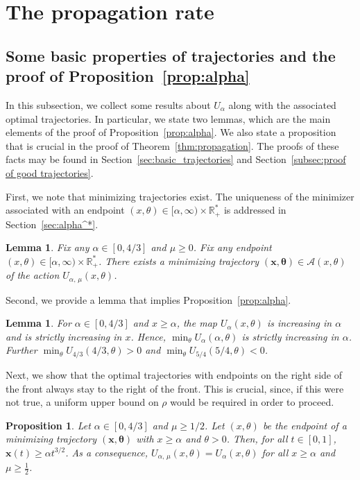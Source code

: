 \documentclass[10pt]{amsart}
\newtheorem{lemm}[theo]{Lemma}\newtheorem{prop}[theo]{Proposition}\newtheorem{coro}[theo]{Corollary}\newtheorem{conj}[theo]{Conjecture}
\theoremstyle{definition}\newtheorem{defi}[theo]{Definition}\newtheorem{rema}[theo]{Remark}\newtheorem{exam}[theo]{Example}\newtheorem{exem}[theo]{Example}\newtheorem{nota}[theo]{Notation}
\newcommand{\R}{\mathbb{R}}
\newcommand{\bx}{\mathbf{x}}
\newcommand{\mA}{\mathcal{A}}
\newcommand{\btheta}{\boldsymbol{\theta}}
\newcommand{\1}{\mathds{1}}
\begin{document}
\section{The propagation rate}
\label{sec:contradiction}

\subsection{Some basic properties of trajectories and the proof of Proposition~\ref{prop:alpha}}\label{sec:prop:alpha}
In this subsection, we collect some results about $U_\alpha$ along with the associated optimal trajectories. In particular, we state two lemmas, which are the main elements of the proof of Proposition~\ref{prop:alpha}. We also state a proposition that is crucial in the proof of Theorem~\ref{thm:propagation}. The proofs of these facts may be found in Section~\ref{sec:basic_trajectories} and Section~\ref{subsec:proof of good trajectories}.

First, we note that minimizing trajectories exist. The uniqueness of the minimizer associated with an endpoint $(x,\theta)\in [\alpha,\infty)\times\R_+^*$ is addressed in Section~\ref{sec:alpha^*}.

\begin{lemm}\label{lem:minimizer_existence}
Fix any $\alpha \in [0,4/3]$ and $\mu \geq 0$. Fix any endpoint $(x,\theta) \in [\alpha,\infty)\times\R_+^*$. There exists a minimizing trajectory $(\bx,\btheta) \in \mA(x,\theta)$ of the action $U_{\alpha,\,\mu}(x,\theta)$.
\end{lemm}

Second, we provide a lemma that implies Proposition~\ref{prop:alpha}.

\begin{lemm}\label{lem:well-defined-alpha}
For $\alpha \in [0,4/3]$ and $x\geq \alpha$, the map $U_\alpha(x, \theta)$ is increasing in $\alpha$ and is strictly increasing in $x$. Hence, $\min_\theta U_\alpha(\alpha,\theta)$ is strictly increasing in $\alpha$. Further $\min_\theta U_{4/3}(4/3, \theta) >0$ and $\min_\theta U_{5/4}(5/4,\theta) <0$.
\end{lemm}


Next, we show that the optimal trajectories with endpoints on the right side of the front always stay to the right of the front. This is crucial, since, if this were not true, a uniform upper bound on $\rho$ would be required in order to proceed.

\begin{prop}\label{lem:good_trajectories}
Let $\alpha \in [0,4/3]$ and $\mu \geq 1/2$. Let $(x,\theta)$ be the endpoint of a minimizing trajectory $(\bx, \btheta)$ with $x \geq \alpha$ and $\theta > 0$. Then, for all $t \in [0,1]$, $\bx(t) \geq \alpha t^{3/2}$. As a consequence, $U_{\alpha,\,\mu}(x,\theta)= U_{\alpha }(x,\theta)$ for all $x\geq \alpha$ and $\mu\geq \frac 12$.
\end{prop}
\end{document}
